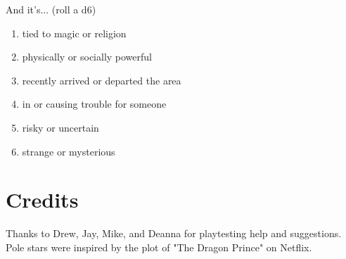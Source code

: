\documentclass[10pt,oneside,letterpaper,landscape]{memoir}
\begin{document}
\begin{multicols}{3}
And it's... (roll a d6)

\begin{enumerate}
\item [1:] tied to magic or religion
\item [2:] physically or socially powerful
\item [3:] recently arrived or departed the area
\item [4:] in or causing trouble for someone
\item [5:] risky or uncertain
\item [6:] strange or mysterious
\end{enumerate}

\section{Credits}

Thanks to Drew, Jay, Mike, and Deanna for playtesting help and suggestions.
Pole stars were inspired by the plot of "The Dragon Prince" on Netflix.

\end{multicols}

\end{document}
